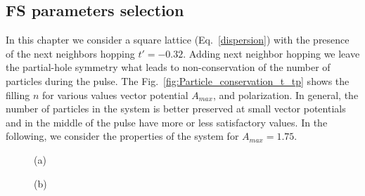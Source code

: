 \subsection{FS parameters selection}
In this chapter we consider a square lattice (Eq.~\ref{dispersion}) with the presence of the next neighbors hopping $t'=-0.32$. Adding next neighbor hopping we leave the partial-hole symmetry what leads to non-conservation of the number of particles during the pulse. The Fig.~\ref{fig:Particle_conservation_t_tp} shows the filling $n$ for various values vector potential $A_{max}$, and polarization.
In general, the number of particles in the system is better preserved at small vector potentials and in the middle of the pulse have more or less satisfactory values. In the following, we consider the properties of the system for $A_{max}=1.75$.
\begin{figure}[h!]
\begin{minipage}[h]{0.5\linewidth}
 (a) \\
\end{minipage}
\hfill
\begin{minipage}[h]{0.5\linewidth}
 (b) \\

\end{minipage}
\end{figure}
